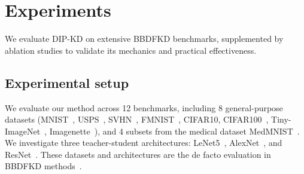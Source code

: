 \section{Experiments} \label{sec:04-experiments}

\begin{foldable} %
  We evaluate DIP-KD on extensive BBDFKD benchmarks, supplemented by ablation studies to validate its mechanics and practical effectiveness.
\end{foldable}

\subsection{Experimental setup} \label{sec:04-experiments-setup}
\begin{foldable} %
  We evaluate our method across 12 benchmarks, including 8 general-purpose datasets (MNIST~\cite{lecun2002gradient}, USPS~\cite{hull1994database}, SVHN~\cite{netzer2011reading}, FMNIST~\cite{xiao2017fashion}, CIFAR10, CIFAR100~\cite{krizhevsky2009learning}, Tiny-ImageNet~\cite{le2015tiny}, Imagenette~\cite{howard2020imagenette}), and 4 subsets from the medical dataset MedMNIST~\cite{yang2021medmnist}.
  We investigate three teacher-student architectures: LeNet5~\cite{lecun2002gradient}, AlexNet~\cite{krizhevsky2012imagenet}, and ResNet~\cite{he2016deep}.
  These datasets and architectures are the de facto evaluation in BBDFKD methods~\cite{wang2021zero, zhang2022ideal, yuan2024data}.
\end{foldable}

